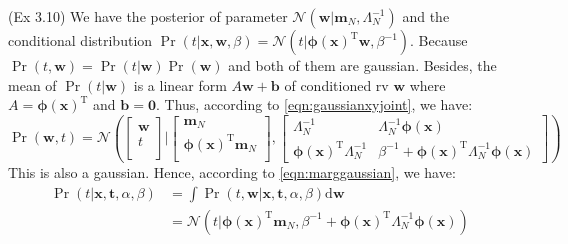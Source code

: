 (Ex 3.10) We have the posterior of parameter $\mathcal{N}(\mathbf{w}\vert\mathbf{m}_{N},\Lambda_{N}^{-1})$ and 
the conditional distribution $\Pr(t\vert\mathbf{x},\mathbf{w},\beta)=\mathcal{N}(t\vert\boldsymbol{\phi}(\mathbf{x})^{\mathrm{T}}\mathbf{w},\beta^{-1})$. 
Because $\Pr(t,\mathbf{w})=\Pr(t\vert\mathbf{w})\Pr(\mathbf{w})$ and both of them are gaussian. 
Besides, the mean of $\Pr(t\vert\mathbf{w})$ is a linear form $A\mathbf{w}+\mathbf{b}$ of conditioned rv $\mathbf{w}$ where $A=\boldsymbol{\phi}(\mathbf{x})^{\mathrm{T}}$ and $\mathbf{b}=\mathbf{0}$. 
Thus, according to \eqref{eqn:gaussianxyjoint}, we have:
\begin{equation}
\Pr(\mathbf{w},t)=\mathcal{N}(\begin{bmatrix}\mathbf{w}\\t\\\end{bmatrix}\vert\begin{bmatrix}\mathbf{m}_{N}\\\boldsymbol{\phi}(\mathbf{x})^{\mathrm{T}}\mathbf{m}_{N}\\\end{bmatrix},\begin{bmatrix}\Lambda_{N}^{-1}&\Lambda_{N}^{-1}\boldsymbol{\phi}(\mathbf{x})\\\boldsymbol{\phi}(\mathbf{x})^{\mathrm{T}}\Lambda_{N}^{-1}&\beta^{-1}+\boldsymbol{\phi}(\mathbf{x})^{\mathrm{T}}\Lambda_{N}^{-1}\boldsymbol{\phi}(\mathbf{x})\end{bmatrix})
\end{equation}
This is also a gaussian. Hence, according to \eqref{eqn:marggaussian}, we have:
\begin{equation}
\begin{split}
\Pr(t\vert\mathbf{x},\mathbf{t},\alpha,\beta)&=\int\Pr(t,\mathbf{w}\vert\mathbf{x},\mathbf{t},\alpha,\beta)\text{d}\mathbf{w}\\
&=\mathcal{N}(t\vert{}\boldsymbol{\phi}(\mathbf{x})^{\mathrm{T}}\mathbf{m}_{N},\beta^{-1}+\boldsymbol{\phi}(\mathbf{x})^{\mathrm{T}}\Lambda_{N}^{-1}\boldsymbol{\phi}(\mathbf{x}))
\end{split}
\end{equation}


